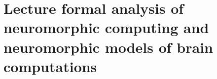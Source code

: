 \section{ Lecture formal analysis of neuromorphic computing and neuromorphic models of brain computations }\label{sec:q1}    
